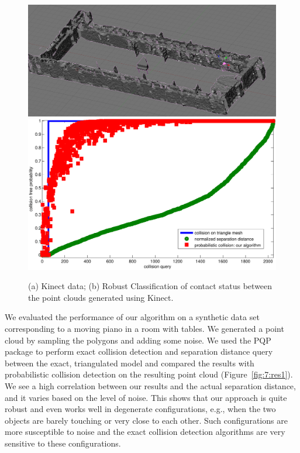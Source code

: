 \begin{figure}[htb]
  \centering
  \includegraphics[width=0.79\linewidth]{figs/7/kinect.png}
  \includegraphics[width=0.79\linewidth]{figs/7/kinect.pdf}
  \caption[Comparison between the results for $100$ random queries between prior collision detection algorithms for exact triangle meshes and our
  algorithm on the Kinect data]{\label{fig:7:res3} (a) Kinect data; (b) Robust Classification of contact status between the point clouds generated using Kinect.}
\end{figure}



We evaluated the performance of our algorithm on a synthetic data set corresponding to a moving piano in a room with tables.
We generated a point cloud by sampling the polygons and adding some noise. We used the PQP package to perform exact collision detection and separation
distance query between the exact, triangulated model and compared the results with probabilistic collision detection on the resulting point cloud (Figure~\ref{fig:7:res1}). We see a high correlation between our results and the actual separation distance, and it varies based on the level of noise.
This shows that our approach is quite robust and even works well in degenerate configurations, e.g., when the two objects are barely touching or very close to each other. Such configurations are more susceptible to noise and the exact collision detection algorithms are very sensitive to these configurations.


